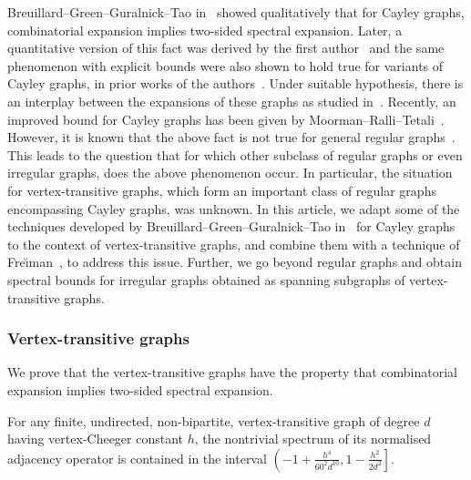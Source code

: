Breuillard--Green--Guralnick--Tao in~\cite[Appendix E]{BGGTExpansionSimpleLie} showed qualitatively that for Cayley graphs, combinatorial expansion implies two-sided spectral expansion. Later, a quantitative version of this fact was derived by the first author~\cite{BiswasCheegerCayley} and the same phenomenon with explicit bounds were also shown to hold true for variants of Cayley graphs, in prior works of the authors~\cite{CheegerCayleySum, CheegerTwisted}. Under suitable hypothesis, there is an interplay between the expansions of these graphs as studied in~\cite{Expansion}. Recently, an improved bound for Cayley graphs has been given by Moorman--Ralli--Tetali~\cite{CayleyBottomBipartite}. However, it is known that the above fact is not true for general regular graphs~\cite[Example 2.1]{CayleyBottomBipartite}. This leads to the question that for which other subclass of regular graphs or even irregular graphs, does the above phenomenon occur. In particular, the situation for vertex-transitive graphs, which form an important class of regular graphs encompassing Cayley graphs, was unknown. In this article, we adapt some of the techniques developed by Breuillard--Green--Guralnick--Tao in~\cite[Appendix E]{BGGTExpansionSimpleLie} for Cayley graphs to the context of vertex-transitive graphs, and combine them with a technique of Fre\u{\i}man~\cite{FreimanGroupsInverseProb}, to address this issue. Further, we go beyond regular graphs and obtain spectral bounds for irregular graphs obtained as spanning subgraphs of vertex-transitive graphs.

\subsubsection{Vertex-transitive graphs}
We prove that the vertex-transitive graphs have the property that combinatorial expansion implies two-sided spectral expansion. 

\begin{theorem}
\label{Thm:Intro}
For any finite, undirected, non-bipartite, vertex-transitive graph of degree $d$ having vertex-Cheeger constant $h$, the nontrivial spectrum of its normalised adjacency operator is contained in the interval $\left(-1 + \frac{h^4}{60^2 d^{10}}, 1- \frac{h^2}{2d^2}\right]$. 
\end{theorem}

